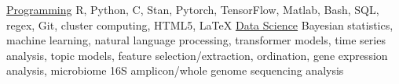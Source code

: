 

\begin{cvskills}

  \cvskill
    {\href{https://github.com/sw1}{Programming}} %
    {R, Python, C, Stan, Pytorch, TensorFlow, Matlab, Bash, SQL, regex, Git, cluster computing, HTML5, \LaTeX} %
\cvskill
    {\href{https://sw1.github.io/teaching/}{Data Science}} %
    {Bayesian statistics, machine learning, natural language processing, transformer models, time series analysis, topic models, feature selection/extraction, ordination, gene expression analysis, microbiome 16S amplicon/whole genome sequencing analysis} %

\end{cvskills}
